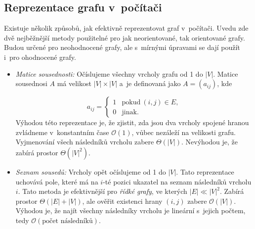 \documentclass[12pt]{report}			%
\begin{document}
			
			\subsection{Reprezentace grafu v~počítači}
Existuje několik způsobů, jak efektivně reprezentovat graf v~počítači. %
Uvedu zde dvě nejběžnější metody použitelné pro jak neorientované, tak orientované grafy. Budou určené pro neohodnocené grafy, ale s~mírnými úpravami se dají použít i~pro ohodnocené grafy.

\begin{itemize}
	\item \emph{Matice sousednosti:} Očíslujeme všechny vrcholy grafu od 1 do $|V|$. Matice sousednosi $A$ má velikost $|V| \times |V|$ a~je definovaná jako $A = (a_{ij})$, kde
	
    $$a_{ij}=
    \begin{cases}
      1 & \text{pokud}\ (i,j)\in E, \\
      0 & \text{jinak}.
    \end{cases}$$
  Výhodou této reprezentace je, že zjistit, zda jsou dva vrcholy spojené hranou zvládneme v~konstantním čase $\mathcal{O}(1)$, vůbec nezáleží na velikosti grafu. Vyjmenování všech následníků vrcholu zabere $\Theta(|V|)$. Nevýhodou je, že zabírá prostor $\Theta(|V|^2)$.
	
	\item \emph{Seznam sousedů:} Vrcholy opět očíslujeme od 1 do $|V|$. Tato reprezentace uchovává pole, které má na $i$-té pozici ukazatel na seznam následníků vrcholu $i$. %
	Tato metoda je efektivnější pro \emph{řídké grafy}, ve kterých $|E| \ll |V|^2$. Zabírá prostor $\Theta(|E|+|V|)$, ale ověřit existenci hrany $(i,j)$ zabere $\mathcal{O}(|V|)$. Výhodou je, že najít všechny následníky vrcholu je lineární s~jejich počtem, tedy $\mathcal{O}(\textrm{počet následníků})$.%
	

\end{itemize}

\end{document}
